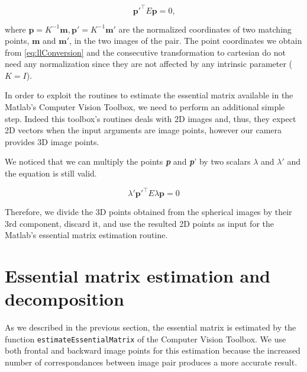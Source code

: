 \begin{equation}
\label{eq:essentialMatrix}
\mathbf{p}'^\top E\mathbf{p} = 0 \text{,}
\end{equation}

\noindent where 
\begin{math}\mathbf{p} = K^{-1} \mathbf{m},
\mathbf{p}' = K^{-1} \mathbf{m}'\end{math} are the normalized coordinates of 
two matching points, \begin{math}\mathbf{m}\end{math} and
\begin{math}\mathbf{m'}\end{math}, in the two images of the pair.
The point coordinates we obtain from \ref{eq:llConversion} and the consecutive 
transformation to cartesian do not need any normalization since they are not 
affected by any intrinsic parameter
(\begin{math}K = I\end{math}).

In order to exploit the routines to estimate the essential matrix available 
in the Matlab's Computer Vision Toolbox, we need to perform an additional simple 
step.
Indeed this toolbox's routines deals with 2D images and, thus, they expect 
2D vectors when the input arguments are image points, however our camera
provides 3D image points.

We noticed that we can multiply the points \textbf{\textit{p}}
and \textbf{\textit{p}}' by two 
scalars \begin{math}{\lambda}\end{math} and 
\begin{math}{\lambda}'\end{math} and the equation is still valid.

\begin{equation*}
\lambda'\mathbf{p}'^\top E\lambda\mathbf{p} = 0
\end{equation*}

Therefore, we divide the 3D points obtained from the spherical images by their 
3rd component, discard it, and use the resulted 2D points as input for the 
Matlab's essential matrix estimation routine.

\section{Essential matrix estimation and decomposition}
As we described in the previous section, the essential matrix is estimated 
by the function {\tt estimateEssentialMatrix} of the Computer Vision Toolbox.
We use both frontal and backward image points for this estimation because
the increased number of correspondances between image pair produces 
a more accurate result.

